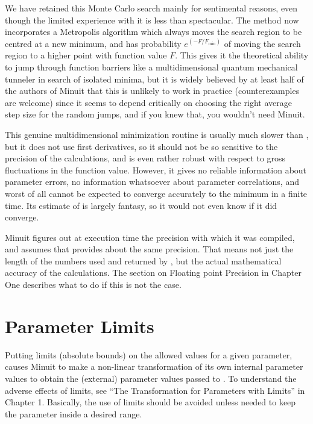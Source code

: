 We have retained this Monte Carlo search mainly for sentimental
reasons, even though the limited experience with it is
less than spectacular.
The method now incorporates a Metropolis algorithm which always
moves the search region to be centred at a new minimum,
and has probability 
$ e ^{(-F/F_{\mathrm{min}})}$
of moving the search region to a higher point with function value $F$.
This gives it the theoretical ability to jump
through function barriers like a multidimensional
quantum mechanical tunneler in search of isolated minima, but it is
widely believed by at least half of the authors of Minuit that this
is unlikely to work in practice (counterexamples are welcome)
since it seems to depend critically on choosing
the right average step size for the random jumps,
and if you knew that, you wouldn't need Minuit.


This genuine multidimensional minimization routine is usually much
slower than , but it does not use first derivatives,
so it should not be so sensitive to the precision of the 
calculations, and is even rather robust with respect to
gross fluctuations in the function value.
However, it gives no reliable information about parameter errors,
no information whatsoever about parameter correlations,
and worst of all cannot be expected to converge accurately
to the minimum in a finite time.
Its estimate of  is largely fantasy, so it would not even
know if it did converge.


Minuit figures out at execution time the precision with which it was
compiled, and assumes that  provides about the same precision.
That means not just the length of the numbers used and returned
by , but the actual mathematical accuracy of the calculations.
The section on Floating point Precision in Chapter One describes
what to do if this is not the case.

\section{Parameter Limits}

Putting limits (absolute bounds) on the allowed values for
a given parameter, causes Minuit to make a non-linear
transformation of its own internal parameter values to obtain the
(external) parameter values passed to .
To understand the adverse effects of limits, see ``The Transformation
for Parameters with Limits'' in Chapter 1.
Basically, the use of limits should be avoided unless needed to
keep the parameter inside a desired range.
 
